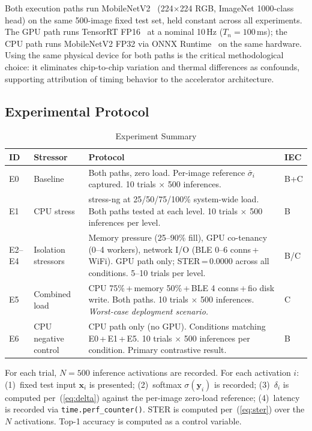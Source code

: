 \documentclass[journal,10pt,twocolumn]{IEEEtran}
\begin{document}
Both execution paths run MobileNetV2~\cite{sandler2018} (224$\times$224
RGB, ImageNet 1000-class head) on the same 500-image fixed test set,
held constant across all experiments.
The GPU path runs TensorRT FP16~\cite{tensorrt} at a nominal 10\,Hz
($T_n = 100$\,ms); the CPU path runs MobileNetV2 FP32 via ONNX
Runtime~\cite{onnxruntime} on the same hardware.
Using the same physical device for both paths is the critical
methodological choice: it eliminates chip-to-chip variation and thermal
differences as confounds, supporting attribution of timing behavior to
the accelerator architecture.

\subsection{Experimental Protocol}

\begin{table}[!t]
\caption{Experiment Summary}
\label{tab:experiments}
\centering
\small
\begin{tabular}{p{0.5cm}p{1.8cm}p{4.6cm}p{0.55cm}}
\toprule
\textbf{ID} & \textbf{Stressor} & \textbf{Protocol} & \textbf{IEC} \\
\midrule
E0 & Baseline & Both paths, zero load. Per-image reference $\bar{\sigma}_i$ captured. 10 trials $\times$ 500 inferences. & B+C \\
\addlinespace
E1 & CPU stress & stress-ng at 25/50/75/100\% system-wide load. Both paths tested at each level. 10 trials $\times$ 500 inferences per level. & B \\
\addlinespace
E2--E4 & Isolation stressors & Memory pressure (25--90\% fill), GPU co-tenancy (0--4 workers), network I/O (BLE 0--6 conns\,+\,WiFi). GPU path only; STER\,=\,0.0000 across all conditions. 5--10 trials per level. & B/C \\
\addlinespace
E5 & Combined load & CPU 75\%\,+\,memory 50\%\,+\,BLE 4 conns\,+\,fio disk write. Both paths. 10 trials $\times$ 500 inferences. \emph{Worst-case deployment scenario.} & C \\
\addlinespace
E6 & CPU negative control & CPU path only (no GPU). Conditions matching E0\,+\,E1\,+\,E5. 10 trials $\times$ 500 inferences per condition. Primary contrastive result. & B \\
\bottomrule
\end{tabular}
\end{table}

For each trial, $N = 500$ inference activations are recorded.
For each activation $i$: (1)~fixed test input $\mathbf{x}_i$ is
presented; (2)~softmax $\sigma(\mathbf{y}_i)$ is recorded;
(3)~$\delta_i$ is computed per~(\ref{eq:delta}) against the per-image
zero-load reference; (4)~latency is recorded via \texttt{time.perf\_counter()}.
STER is computed per~(\ref{eq:ster}) over the $N$ activations.
Top-1 accuracy is computed as a control variable.
\end{document}
